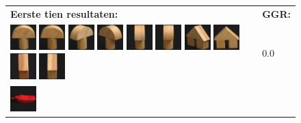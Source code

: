{\begin{figure}[p]
\vspace{5pt}
\centering
\begin{tabular}{m{11cm} | m{3cm} |}
\textbf{Eerste tien resultaten:} & \textbf{GGR:} \\
\vspace{4pt}
\includegraphics[width=1cm]{coil/beeld-0.eps}
\includegraphics[width=1cm]{coil/beeld-1.eps}
\includegraphics[width=1cm]{coil/beeld-3.eps}
\includegraphics[width=1cm]{coil/beeld-4.eps}
\includegraphics[width=1cm]{coil/beeld-2.eps}
\includegraphics[width=1cm]{coil/beeld-5.eps}
\includegraphics[width=1cm]{coil/beeld-46.eps}
\includegraphics[width=1cm]{coil/beeld-42.eps}
\includegraphics[width=1cm]{coil/beeld-44.eps}
\includegraphics[width=1cm]{coil/beeld-47.eps}
& {\scriptsize 0.0}
\\
\includegraphics[width=1cm]{coil/beeld-18.eps}

\end{tabular}
\end{figure}}
